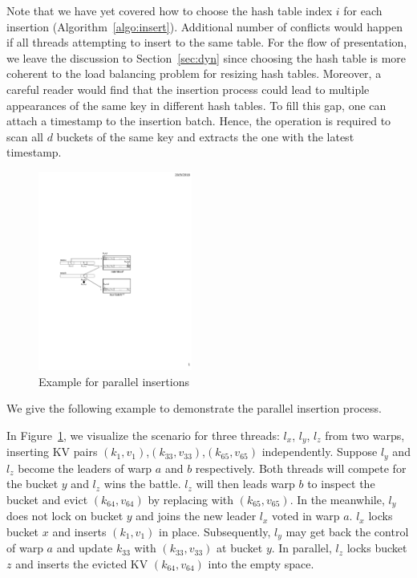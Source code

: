 Note that we have yet covered how to choose the hash table index $i$ for each insertion (Algorithm~\ref{algo:insert}). Additional number of conflicts would happen if all threads attempting to insert to the same table. For the flow of presentation, we leave the discussion to Section~\ref{sec:dyn} since choosing the hash table is more coherent to the load balancing problem for resizing hash tables. Moreover, a careful reader would find that the insertion process could lead to multiple appearances of the same key in different hash tables. To fill this gap, one can attach a timestamp to the insertion batch.
Hence, the  operation is required to scan all $d$ buckets of the same key and extracts the one with the latest timestamp.

\begin{figure}[t]
	\centering
	\includegraphics[width=0.45\textwidth]{fig/Voter.pdf}
	\caption{Example for parallel insertions}
	\label{fig:voter}
\end{figure}

We give the following example to demonstrate the parallel insertion process.
\begin{example}
	In Figure~\ref{fig:voter}, we visualize the scenario for three threads: $l_x$, $l_y$, $l_z$ from two warps, inserting KV pairs $(k_1,v_1)$,$(k_{33},v_{33})$,$(k_{65},v_{65})$ independently. 
	Suppose $l_y$ and $l_z$ become the leaders of warp $a$ and $b$ respectively. Both threads will compete for the bucket $y$ and $l_z$ wins the battle. 
	$l_z$ will then leads warp $b$ to inspect the bucket and evict $(k_{64},v_{64})$ by replacing with $(k_{65},v_{65})$. 
	In the meanwhile, $l_y$ does not lock on bucket $y$ and joins the new leader $l_x$ voted in warp $a$. 
	$l_x$ locks bucket $x$ and inserts $(k_1,v_1)$ in place. Subsequently, $l_y$ may get back the control of warp $a$ and update $k_{33}$ with $(k_{33},v_{33})$ at bucket $y$. In parallel, $l_z$ locks bucket $z$ and inserts the evicted KV $(k_{64},v_{64})$ into the empty space. 
\end{example}

